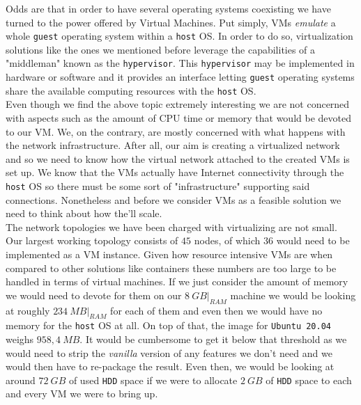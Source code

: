                 Odds are that in order to have several operating systems coexisting we have turned to the power offered by Virtual Machines. Put simply, VMs \textit{emulate} a whole \texttt{guest} operating system within a \texttt{host} OS. In order to do so, virtualization solutions like the ones we mentioned before leverage the capabilities of a "middleman" known as the \texttt{hypervisor}. This \texttt{hypervisor} may be implemented in hardware or software and it provides an interface letting \texttt{guest} operating systems share the available computing resources with the \texttt{host} OS.\\

                Even though we find the above topic extremely interesting we are not concerned with aspects such as the amount of CPU time or memory that would be devoted to our VM. We, on the contrary, are mostly concerned with what happens with the network infrastructure. After all, our aim is creating a virtualized network and so we need to know how the virtual network attached to the created VMs is set up. We know that the VMs actually have Internet connectivity through the \texttt{host} OS so there must be some sort of "infrastructure" supporting said connections. Nonetheless and before we consider VMs as a feasible solution we need to think about how the'll scale.\\

                The network topologies we have been charged with virtualizing are not small. Our largest working topology consists of $45$ nodes, of which $36$ would need to be implemented as a VM instance. Given how resource intensive VMs are when compared to other solutions like containers these numbers are too large to be handled in terms of virtual machines. If we just consider the amount of memory we would need to devote for them on our $8\ GB\rvert_{RAM}$ machine we would be looking at roughly $234\ MB\rvert_{RAM}$ for each of them and even then we would have no memory for the \texttt{host} OS at all. On top of that, the image for \texttt{Ubuntu 20.04} weighs $958,4\ MB$. It would be cumbersome to get it below that threshold as we would need to strip the \textit{vanilla} version of any features we don't need and we would then have to re-package the result. Even then, we would be looking at around $72\ GB$ of used \texttt{HDD} space if we were to allocate $2\ GB$ of \texttt{HDD} space to each and every VM we were to bring up.\\

